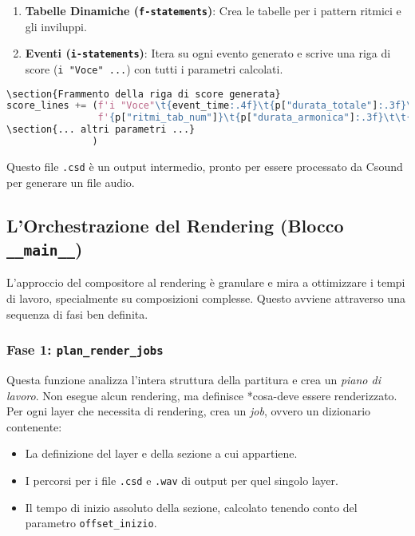 \begin{enumerate}
    \item \textbf{Tabelle Dinamiche (\texttt{f{-}statements})}: Crea le tabelle per i pattern ritmici e gli inviluppi.
    \item \textbf{Eventi (\texttt{i{-}statements})}: Itera su ogni evento generato e scrive una riga di score (\texttt{i "Voce" ...}) con tutti i parametri calcolati.
\end{enumerate}
\begin{lstlisting}[language=Python]
\section{Frammento della riga di score generata}
score_lines += (f'i "Voce"\t{event_time:.4f}\t{p["durata_totale"]:.3f}\t'
                f'{p["ritmi_tab_num"]}\t{p["durata_armonica"]:.3f}\t\t{p["dynamic_index"]:.6f}\t'
\section{... altri parametri ...}
               )
\end{lstlisting}
Questo file \texttt{.csd} è un output intermedio, pronto per essere processato da Csound per generare un file audio.
\subsection{L'Orchestrazione del Rendering (Blocco \texttt{\_\_main\_\_})}
L'approccio del compositore al rendering è granulare e mira a ottimizzare i tempi di lavoro, specialmente su composizioni complesse. Questo avviene attraverso una sequenza di fasi ben definita.
\subsubsection{Fase 1: \texttt{plan\_render\_jobs}}
Questa funzione analizza l'intera struttura della partitura e crea un \textit{piano di lavoro}. Non esegue alcun rendering, ma definisce *cosa-deve essere renderizzato. Per ogni layer che necessita di rendering, crea un \textit{job}, ovvero un dizionario contenente:
\begin{itemize}
    \item La definizione del layer e della sezione a cui appartiene.
    \item I percorsi per i file \texttt{.csd} e \texttt{.wav} di output per quel singolo layer.
    \item Il tempo di inizio assoluto della sezione, calcolato tenendo conto del parametro \texttt{offset\_inizio}.
\end{itemize}
